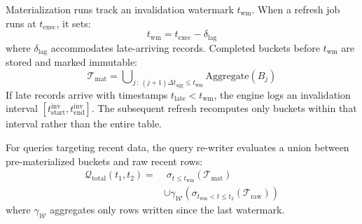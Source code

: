 \documentclass[conference,a4paper]{IEEEtran}
\begin{document}
Materialization runs track an invalidation watermark $t_{\mathrm{wm}}$. When a refresh job runs at $t_{\mathrm{exec}}$, it sets:
\begin{equation}
    t_{\mathrm{wm}} = t_{\mathrm{exec}} - \delta_{\mathrm{lag}}
\end{equation}
where $\delta_{\mathrm{lag}}$ accommodates late-arriving records. Completed buckets before $t_{\mathrm{wm}}$ are stored and marked immutable:
\begin{equation}
    \mathcal{T}_{\mathrm{mat}} = \bigcup\nolimits_{j \,:\, (j+1)\Delta t_{\mathrm{agg}} \le t_{\mathrm{wm}}} \mathrm{Aggregate}(B_j)
\end{equation}
If late records arrive with timestamps $t_{\mathrm{late}} < t_{\mathrm{wm}}$, the engine logs an invalidation interval $[t_{\mathrm{start}}^{\mathrm{inv}}, t_{\mathrm{end}}^{\mathrm{inv}}]$. The subsequent refresh recomputes only buckets within that interval rather than the entire table.

For queries targeting recent data, the query re-writer evaluates a union between pre-materialized buckets and raw recent rows:
\begin{equation}
\begin{split}
    \mathcal{Q}_{\mathrm{total}}(t_1, t_2) = &\; \sigma_{t \le t_{\mathrm{wm}}}(\mathcal{T}_{\mathrm{mat}}) \\
    &\cup \gamma_{\mathcal{W}}\left( \sigma_{t_{\mathrm{wm}} < t \le t_2}(\mathcal{T}_{\mathrm{raw}}) \right)
\end{split}
\end{equation}
where $\gamma_{\mathcal{W}}$ aggregates only rows written since the last watermark.
\end{document}
